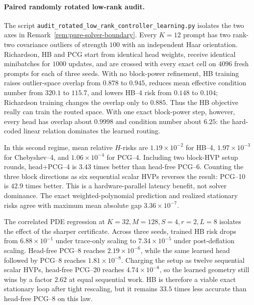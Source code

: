 \documentclass[11pt]{article}
\begin{document}
\paragraph{Paired randomly rotated low-rank audit.}
The script \texttt{audit\_rotated\_low\_rank\_controller\_learning.py}
isolates the two axes in Remark~\ref{rem:pure-solver-boundary}.  Every
$K=12$ prompt has two rank-two covariance outliers of strength $100$ with an
independent Haar orientation.  Richardson, HB and PCG start from identical
head weights, receive identical minibatches for $1000$ updates, and are
crossed with every exact cell on $4096$ fresh prompts for each of three seeds.
With no block-power refinement, HB training raises outlier-space overlap from
$0.878$ to $0.945$, reduces mean effective condition number from $320.1$ to
$115.7$, and lowers HB--4 risk from $0.148$ to $0.104$; Richardson training
changes the overlap only to $0.885$.  Thus the HB objective really can train
the routed space.  With one exact block-power step, however, every head has
overlap about $0.9998$ and condition number about $6.25$: the hard-coded
linear relation dominates the learned routing.

In this second regime, mean relative $H$-risks are $1.19\times10^{-2}$ for
HB--4, $1.97\times10^{-3}$ for Chebyshev--4, and $1.06\times10^{-4}$ for
PCG--4.  Including two block-HVP setup rounds, head+PCG--4 is $3.43$ times
better than head-free PCG--6.  Counting the three block directions as six
sequential scalar HVPs reverses the result: PCG--10 is $42.9$ times better.
This is a hardware-parallel latency benefit, not solver dominance.  The exact
weighted-polynomial prediction and realized stationary risks agree with
maximum mean absolute gap $3.36\times10^{-7}$.

The correlated PDE regression at $K=32,M=128,S=4,r=2,L=8$ isolates the
effect of the sharper certificate.  Across three seeds, trained HB risk drops
from $6.88\times10^{-1}$ under trace-only scaling to
$7.34\times10^{-5}$ under post-deflation scaling.  Head-free PCG--8 reaches
$2.19\times10^{-6}$, while the same learned head followed by PCG--8 reaches
$1.81\times10^{-8}$.  Charging the setup as twelve sequential scalar HVPs,
head-free PCG--20 reaches $4.74\times10^{-8}$, so the learned geometry still
wins by a factor $2.62$ at equal sequential work.  HB is therefore a viable
exact stationary loop after tight rescaling, but it remains $33.5$ times less
accurate than head-free PCG--8 on this law.
\end{document}
